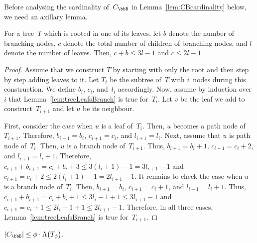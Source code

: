 Before analysing the cardinality of~$C_\bbB$ in Lemma~\ref{lem:CBcardinality} below, we need an axillary lemma.

\begin{lemma}
    \label{lem:treeLeafsBranch}
For a tree~\( T \) which is rooted in one of its leaves, let \( b \) denote the number of branching nodes, \( c \) denote the total number of children of branching nodes, and \( l \) denote the number of leaves.
Then, \( c + b \leq 3 l - 1 \) and \( c \leq 2 l - 1 \).
\end{lemma}

\begin{proof}
Assume that we construct $T$ by starting with only the root and then step by step adding leaves to it.
Let $T_i$ be the subtree of~$T$ with $i$~nodes during this construction.
We define $b_i$, $c_i$, and~$l_i$ accordingly.
Now, assume by induction over~$i$ that Lemma~\ref{lem:treeLeafsBranch} is true for~$T_i$.
Let $v$ be the leaf we add to construct~$T_{i+1}$ and let $u$ be its neighbour.

First, consider the case when $u$ is a leaf of~$T_i$.
Then, $u$ becomes a path node of~$T_{i+1}$.
Therefore, $b_{i+1} = b_i$, $c_{i+1} = c_i$, and $l_{i+1} = l_i$.
%
Next, assume that $u$ is path node of~$T_i$.
Then, $u$ is a branch node of~$T_{i+1}$.
Thus, $b_{i+1} = b_i + 1$, $c_{i+1} = c_i + 2$, and $l_{i+1} = l_i + 1$.
Therefore, $c_{i+1} + b_{i+1} = c_i + b_i + 3 \leq 3 (l_i + 1) - 1 = 3 l_{i+1} - 1$ and $c_{i+1} = c_i + 2 \leq 2 (l_i + 1) - 1 = 2 l_{i+1} - 1$.
%
It remains to check the case when $u$ is a branch node of~$T_i$.
Then, $b_{i+1} = b_i$, $c_{i+1} = c_i + 1$, and $l_{i+1} = l_i + 1$.
Thus, $c_{i+1} + b_{i+1} = c_i + b_i + 1 \leq 3 l_i - 1 + 1 \leq 3 l_{i+1} - 1$ and $c_{i+1} = c_i + 1 \leq 2 l_i - 1 + 1 \leq 2 l_{i+1} - 1$.
Therefore, in all three cases, Lemma~\ref{lem:treeLeafsBranch} is true for~$T_{i+1}$.
\end{proof}

\begin{lemma}
    \label{lem:CBcardinality}
\( |C_\bbB| \leq \phi \cdot \Lambda \big( T_\phi \big) \).
\end{lemma}

